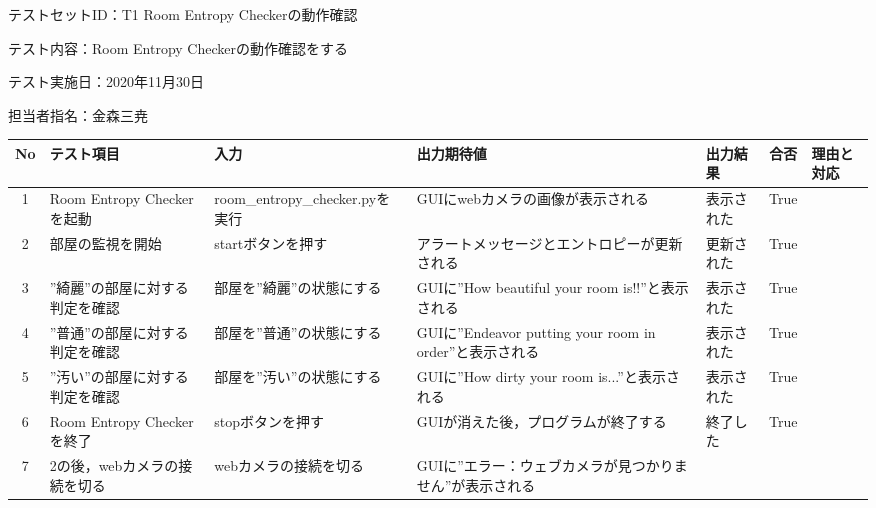 テストセットID：T1 Room Entropy Checkerの動作確認

テスト内容：Room Entropy Checkerの動作確認をする

テスト実施日：2020年11月30日

担当者指名：金森三尭


\begin{table}[H]
    \centering
    \begin{tabular}{|c|p{11em}|p{11em}|p{7em}|p{6em}|c|p{5em}|} \hline
        No & テスト項目 & 入力 & 出力期待値 & 出力結果 & 合否 & 理由と対応 \\ \hline
        1 & Room Entropy Checkerを起動 & room\_entropy\_checker.pyを実行 & GUIにwebカメラの画像が表示される & 表示された & True & \\ \hline
        2 & 部屋の監視を開始 & startボタンを押す & アラートメッセージとエントロピーが更新される & 更新された & True & \\ \hline
        3 & ”綺麗”の部屋に対する判定を確認 & 部屋を”綺麗”の状態にする & GUIに”How beautiful your room is!!”と表示される & 表示された & True & \\ \hline
        4 & ”普通”の部屋に対する判定を確認 & 部屋を”普通”の状態にする & GUIに”Endeavor putting your room in order”と表示される & 表示された & True & \\ \hline
        5 & ”汚い”の部屋に対する判定を確認 & 部屋を”汚い”の状態にする & GUIに”How dirty your room is...”と表示される & 表示された & True & \\ \hline
        6 & Room Entropy Checkerを終了 & stopボタンを押す & GUIが消えた後，プログラムが終了する & 終了した & True & \\ \hline
        7 & 2の後，webカメラの接続を切る & webカメラの接続を切る & GUIに”エラー：ウェブカメラが見つかりません”が表示される &  &  & \\ \hline
    \end{tabular}
    \label{tab:test_set1}
\end{table}